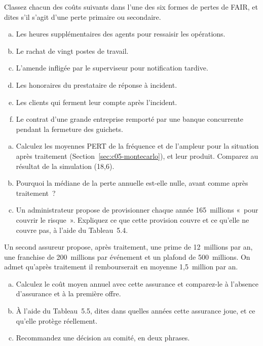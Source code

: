 \begin{boxexo}[title={\ding{45}\quad Exercice~5.1. Six formes de pertes \niveaubase}]
Classez chacun des coûts suivants dans l'une des six formes de pertes de
FAIR, et dites s'il s'agit d'une perte primaire ou secondaire.
\begin{enumerate}[(a)]
    \item Les heures supplémentaires des agents pour ressaisir les
          opérations.
    \item Le rachat de vingt postes de travail.
    \item L'amende infligée par le superviseur pour notification tardive.
    \item Les honoraires du prestataire de réponse à incident.
    \item Les clients qui ferment leur compte après l'incident.
    \item Le contrat d'une grande entreprise remporté par une banque
          concurrente pendant la fermeture des guichets.
\end{enumerate}
\end{boxexo}

\begin{boxexo}[title={\ding{45}\quad Exercice~5.2. Le chiffre trompeur \niveaumoyen}]
\begin{enumerate}[(a)]
    \item Calculez les moyennes PERT de la fréquence et de l'ampleur pour la
          situation après traitement (Section~\ref{sec:c05-montecarlo}), et
          leur produit. Comparez au résultat de la simulation (18,6).
    \item Pourquoi la médiane de la perte annuelle est-elle nulle, avant
          comme après traitement~?
    \item Un administrateur propose de provisionner chaque année
          165~millions «~pour couvrir le risque~». Expliquez ce que cette
          provision couvre et ce qu'elle ne couvre pas, à l'aide du
          Tableau~5.4.
\end{enumerate}
\end{boxexo}

\begin{boxexo}[title={\ding{45}\quad Exercice~5.3. Une autre offre d'assurance \niveaumoyen}]
Un second assureur propose, après traitement, une prime de 12~millions par
an, une franchise de 200~millions par événement et un plafond de
500~millions. On admet qu'après traitement il rembourserait en moyenne
1,5~million par an.
\begin{enumerate}[(a)]
    \item Calculez le coût moyen annuel avec cette assurance et comparez-le
          à l'absence d'assurance et à la première offre.
    \item À l'aide du Tableau~5.5, dites dans quelles années cette
          assurance joue, et ce qu'elle protège réellement.
    \item Recommandez une décision au comité, en deux phrases.
\end{enumerate}
\end{boxexo}

